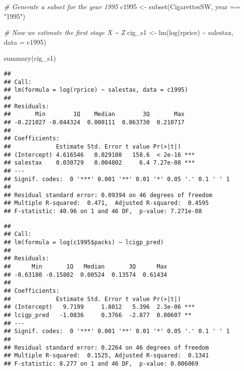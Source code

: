 \documentclass[
]{article}
\newenvironment{Shaded}{\begin{snugshade}}{\end{snugshade}}
\newcommand{\AttributeTok}[1]{\textcolor[rgb]{0.77,0.63,0.00}{#1}}
\newcommand{\CommentTok}[1]{\textcolor[rgb]{0.56,0.35,0.01}{\textit{#1}}}
\newcommand{\FunctionTok}[1]{\textcolor[rgb]{0.00,0.00,0.00}{#1}}
\newcommand{\NormalTok}[1]{#1}
\newcommand{\OtherTok}[1]{\textcolor[rgb]{0.56,0.35,0.01}{#1}}
\newcommand{\SpecialCharTok}[1]{\textcolor[rgb]{0.00,0.00,0.00}{#1}}
\newcommand{\StringTok}[1]{\textcolor[rgb]{0.31,0.60,0.02}{#1}}
\begin{document}
\begin{Shaded}
\begin{Highlighting}[]
\CommentTok{\# Generate a subset for the year 1995}
\NormalTok{c1995 }\OtherTok{\textless{}{-}} \FunctionTok{subset}\NormalTok{(CigarettesSW, year }\SpecialCharTok{==} \StringTok{"1995"}\NormalTok{)}

\CommentTok{\# Now we estimate the first stage X \textasciitilde{} Z}
\NormalTok{cig\_s1 }\OtherTok{\textless{}{-}} \FunctionTok{lm}\NormalTok{(}\FunctionTok{log}\NormalTok{(rprice) }\SpecialCharTok{\textasciitilde{}}\NormalTok{ salestax, }\AttributeTok{data =}\NormalTok{ c1995)}

\FunctionTok{summary}\NormalTok{(cig\_s1)}
\end{Highlighting}
\end{Shaded}

\begin{verbatim}
## 
## Call:
## lm(formula = log(rprice) ~ salestax, data = c1995)
## 
## Residuals:
##       Min        1Q    Median        3Q       Max 
## -0.221027 -0.044324  0.000111  0.063730  0.210717 
## 
## Coefficients:
##             Estimate Std. Error t value Pr(>|t|)    
## (Intercept) 4.616546   0.029108   158.6  < 2e-16 ***
## salestax    0.030729   0.004802     6.4 7.27e-08 ***
## ---
## Signif. codes:  0 '***' 0.001 '**' 0.01 '*' 0.05 '.' 0.1 ' ' 1
## 
## Residual standard error: 0.09394 on 46 degrees of freedom
## Multiple R-squared:  0.471,  Adjusted R-squared:  0.4595 
## F-statistic: 40.96 on 1 and 46 DF,  p-value: 7.271e-08
\end{verbatim}

\begin{Shaded}
\end{Shaded}

\begin{verbatim}
## 
## Call:
## lm(formula = log(c1995$packs) ~ lcigp_pred)
## 
## Residuals:
##      Min       1Q   Median       3Q      Max 
## -0.63180 -0.15802  0.00524  0.13574  0.61434 
## 
## Coefficients:
##             Estimate Std. Error t value Pr(>|t|)    
## (Intercept)   9.7199     1.8012   5.396  2.3e-06 ***
## lcigp_pred   -1.0836     0.3766  -2.877  0.00607 ** 
## ---
## Signif. codes:  0 '***' 0.001 '**' 0.01 '*' 0.05 '.' 0.1 ' ' 1
## 
## Residual standard error: 0.2264 on 46 degrees of freedom
## Multiple R-squared:  0.1525, Adjusted R-squared:  0.1341 
## F-statistic: 8.277 on 1 and 46 DF,  p-value: 0.006069
\end{verbatim}
\end{document}
